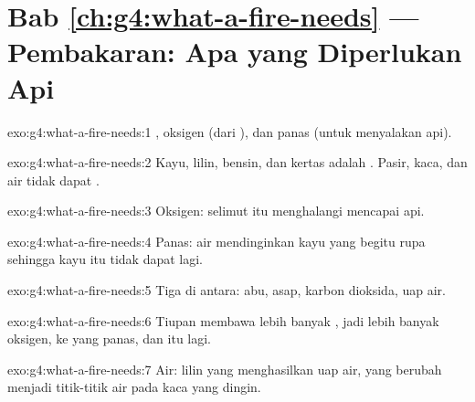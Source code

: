 \section*{Bab \ref{ch:g4:what-a-fire-needs} --- Pembakaran: Apa yang Diperlukan Api}

\begin{solution}{exo:g4:what-a-fire-needs:1}
, oksigen (dari ), dan panas (untuk menyalakan api).
\end{solution}

\begin{solution}{exo:g4:what-a-fire-needs:2}
Kayu, lilin, bensin, dan kertas adalah . Pasir, kaca, dan
air tidak dapat .
\end{solution}

\begin{solution}{exo:g4:what-a-fire-needs:3}
Oksigen: selimut itu menghalangi  mencapai api.
\end{solution}

\begin{solution}{exo:g4:what-a-fire-needs:4}
Panas: air mendinginkan kayu yang  begitu rupa sehingga kayu
itu tidak dapat  lagi.
\end{solution}

\begin{solution}{exo:g4:what-a-fire-needs:5}
Tiga di antara: abu, asap, karbon dioksida, uap air.
\end{solution}

\begin{solution}{exo:g4:what-a-fire-needs:6}
Tiupan membawa lebih banyak , jadi lebih banyak oksigen, ke  yang panas, dan  itu  lagi.
\end{solution}

\begin{solution}{exo:g4:what-a-fire-needs:7}
Air: lilin yang  menghasilkan uap air, yang berubah menjadi
titik-titik air pada kaca yang dingin.
\end{solution}

